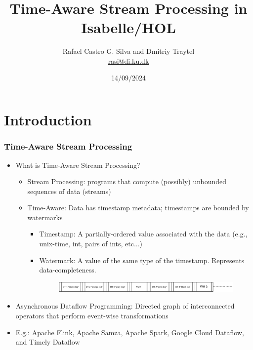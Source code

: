 \documentclass[aspectratio=169,10pt]{beamer}
\title[Time-Aware Stream Processing in Isabelle/HOL]{Time-Aware Stream Processing in Isabelle/HOL}
\author[Rafael Castro and Dmitriy Traytel]{
  Rafael Castro G. Silva and  Dmitriy Traytel\\\medskip
  {\small \url{rasi@di.ku.dk}}}
\date{14/09/2024}
\institute[UCPH]{
  Department of Computer Science \\
  University of Copenhagen}
\begin{document}

\begin{frame}
  \titlepage

\end{frame}
\section{Introduction}

\begin{frame}[fragile]
  \frametitle{Time-Aware Stream Processing}
  \begin{itemize}
    \item What is Time-Aware Stream Processing?
          \begin{itemize}
                  \pause
            \item Stream Processing: programs that compute (possibly) unbounded sequences of data (streams)
                  \pause
            \item Time-Aware: Data has timestamp metadata; timestamps are bounded by watermarks
                  \begin{itemize}
                    \item Timestamp: A partially-ordered value associated with the data (e.g., unix-time, int, pairs of ints, etc...)
                    \item Watermark: A value of the same type of the timestamp. Represents data-completeness.
                          \begin{figure}
                            \centering
                            \includegraphics[width=.75\textwidth]{stream_ex1.pdf}
                          \end{figure}
                  \end{itemize}
          \end{itemize}
          \pause
    \item Asynchronous Dataflow Programming: Directed graph of interconnected operators that perform event-wise transformations
    \item E.g.: Apache Flink, Apache Samza, Apache Spark, Google Cloud Dataflow, and Timely Dataflow
          \vspace*{-1ex}
          \begin{overlayarea}{\textwidth}{.1\textheight}
            \centering
            \begin{figure}

\end{figure}
\end{overlayarea}
\end{itemize}
\end{frame}
\end{document}
